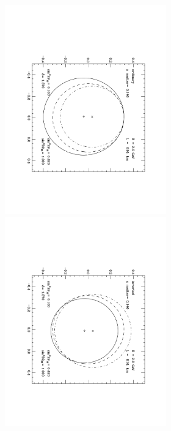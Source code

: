 \begin{figure}\begin{center}
\includegraphics[width=2.75in,angle=90]{RNC/cpv_nova_pibytwo.pdf}
\includegraphics[width=2.75in,angle=90]{RNC/cpv_nova_pibytwo_inv.pdf}


\end{center}
\end{figure}
